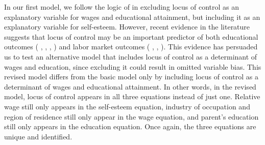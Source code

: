 \documentclass[12pt]{report}
\newcommand{\citee}[1]{\citename{#1} \citeyear{#1}}
\begin{document}
In our first model, we follow the logic of \citee{GVD1997} in excluding locus of control as an explanatory variable for wages  and educational attainment, but including it as an explanatory variable for self-esteem. However, recent evidence in the literature suggests that locus of control may be an important predictor of both educational outcomes (\citee{W1999}, \citee{RB2000}, \citee{CD2003}, \citee{PP2010}) and labor market outcomes (\citee{O2005}, \citee{JH2007}, \citee{FPW2007}). This evidence has persuaded us to test an alternative model that includes locus of control as a determinant of wages and education, since excluding it could result in omitted variable bias. This revised model differs from the basic model only by including locus of control as a determinant of wages and educational attainment. In other words, in the revised model, locus of control appears in all three equations instead of just one. Relative wage still only appears in the self-esteem equation, industry of occupation and region of residence still only appear in the wage equation, and parent's education still only appears in the education equation. Once again, the three equations are unique and identified.
\end{document}
